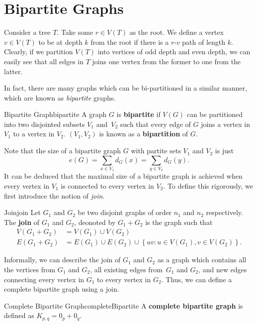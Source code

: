 \documentclass[math, code]{amznotes}
\theoremstyle{remark}
\begin{document}
\section{Bipartite Graphs}
Consider a tree $T$. Take some $r \in V(T)$ as the root. We define a vertex $v \in V(T)$ to be at depth $k$ from the root if there is a $r$-$v$ path of length $k$. Clearly, if we partition $V(T)$ into vertices of odd depth and even depth, we can easily see that all edges in $T$ joins one vertex from the former to one from the latter.

In fact, there are many graphs which can be bi-partitioned in a similar manner, which are known as \textit{bipartite} graphs.
\begin{dfnbox}{Bipartite Graph}{bipartite}
    A graph $G$ is {\color{red} \textbf{bipartite}} if $V(G)$ can be partitioned into two disjointed subsets $V_1$ and~$V_2$ such that every edge of $G$ joins a vertex in $V_1$ to a vertex in $V_2$. $(V_1, V_2)$ is known as a {\color{red} \textbf{bipartition}} of $G$.
\end{dfnbox}
Note that the size of a bipartite graph $G$ with partite sets $V_1$ and $V_2$ is just
\begin{equation*}
    e(G) = \sum_{x \in V_1}d_G(x) = \sum_{y \in V_2}d_G(y).
\end{equation*}
It can be deduced that the maximal size of a bipartite graph is achieved when every vertex in $V_1$ is connected to every vertex in $V_2$. To define this rigorously, we first introduce the notion of \textit{join}.
\begin{dfnbox}{Join}{join}
    Let $G_1$ and $G_2$ be two disjoint graphs of order $n_1$ and $n_2$ respectively. The {\color{red} \textbf{join}} of $G_1$ and $G_2$, deonoted by $G_1 + G_2$ is the graph such that
    \begin{align*}
        V(G_1 + G_2) & = V(G_1) \cup V(G_2) \\
        E(G_1 + G_2) & = E(G_1) \cup E(G_2) \cup \left\{uv \colon u \in V(G_1), v \in V(G_2)\right\}.
    \end{align*}
\end{dfnbox}
Informally, we can describe the join of $G_1$ and $G_2$ as a graph which contains all the vertices from $G_1$ and $G_2$, all existing edges from~$G_1$ and $G_2$, and new edges connecting every vertex in $G_1$ to every vertex in $G_2$. Thus, we can define a complete bipartite graph using a join.
\begin{dfnbox}{Complete Bipartite Graph}{completeBipartite}
    A {\color{red} \textbf{complete bipartite graph}} is defined as $K_{p, q} = 0_p + 0_q$.
\end{dfnbox}
\end{document}
